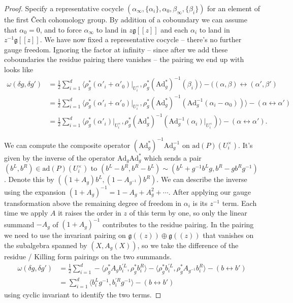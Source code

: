\documentclass[11pt, oneside, reqno]{amsart}
\theoremstyle{definition} \newtheorem{definition}{Definition}[section]
\theoremstyle{definition} \newtheorem{remark}[definition]{Remark}
\theoremstyle{definition} \newtheorem{remarks}[definition]{Remarks}
\theoremstyle{definition} \newtheorem{question}[definition]{Question}
\theoremstyle{definition} \newtheorem*{note}{Note}
\theoremstyle{definition} \newtheorem{example}[definition]{Example}
\theoremstyle{definition} \newtheorem{examples}[definition]{Examples}
\renewcommand{\gg}{\mathfrak{g}}
\newcommand{\mr}[1]{\mathrm{#1}}
\newcommand{\Ad}{\mr{Ad}}
\begin{document}
\begin{proof}
 Specify a representative cocycle $(\alpha_\infty, \{\alpha_i\}, \alpha_0, \beta_\infty, \{\beta_i\})$ for an element of the first \v Cech cohomology group. By addition of a coboundary we can assume that $\alpha_0=0$, and to force $\alpha_\infty$ to land in $z\gg[[z]]$ and each $\alpha_i$ to land in $z^{-1}\gg[[z]]$.  We have now fixed a representative cocycle -- there's no further gauge freedom.  Ignoring the factor at infinity -- since after we add these coboundaries the residue pairing there vanishes -- the pairing we end up with looks like 
\begin{align*}
\omega(\delta g, \delta g') &= \frac 12 \sum_{i=1}^d \langle \rho_g^*(\alpha'_i + \alpha'_0)|_{U^\times_i},\rho_g^* (\Ad_g^*)^{-1}( \beta_i) \rangle - ((\alpha,\beta) \leftrightarrow (\alpha',\beta')\\ 
&= \frac 12 \sum_{i=1}^d \langle \rho_g^*(\alpha'_i + \alpha'_0)|_{U^\times_i}, \rho_g^*(\Ad_g^*)^{-1}(\Ad_g^{-1}(\alpha_i - \alpha_0)) \rangle - (\alpha \leftrightarrow \alpha')\\
&= \frac 12 \sum_{i=1}^d \langle \rho_g^*(\alpha'_i)|_{U^\times_i}, \rho_g^*(\Ad_g^*)^{-1}(\Ad_g^{-1}(\alpha_i)|_{U^\times_i}) \rangle - (\alpha \leftrightarrow \alpha').
\end{align*}

We can compute the composite operator $(\Ad_g^*)^{-1}\Ad_g^{-1}$ on $\mr{ad}(P)(U^\times_i)$.  It's given by the inverse of the operator $\Ad_g\Ad_g^*$ which sends a pair $(b^L, b^R) \in \mr{ad}(P)(U^\times_i)$ to $(b^L - b^R, b^R - b^L) \sim (b^L + g^{-1} b^L g, b^R - g b^R g^{-1})$.  Denote this by $((1+A_g)b^L,(1-A_{g^{-1}})b^R)$.  We can describe the inverse using the expansion $(1+A_g)^{-1} = 1 - A_g + A_g^2 + \cdots$.  After applying our gauge transformation above the remaining degree of freedom in $\alpha_i$ is its $z^{-1}$ term.  Each time we apply $A$ it raises the order in $z$ of this term by one, so only the linear summand $-A_g$ of $(1+A_g)^{-1}$ contributes to the residue pairing.  In the pairing we need to use the invariant pairing on $\gg((z)) \oplus \gg((z))$ that vanishes on the subalgebra spanned by $(X, A_g(X))$, so we take the difference of the residue / Killing form pairings on the two summands.
\begin{align*}
\omega(\delta g, \delta g') &= \frac 12 \sum_{i=1}^d  - \langle \rho_g^*A_g b^{'L}_i, \rho_g^*b^{R}_i \rangle - \langle \rho_g^*b^{'L}_i, \rho_g^*A_{g^{-1}}b^{R}_i \rangle- (b \leftrightarrow b') \\ 
&= \sum_{i=1}^d \langle b^L_ig^{-1}, b^{'R}_i g^{-1} \rangle  - (b \leftrightarrow b')
\end{align*}
using cyclic invariant to identify the two terms. 
\end{proof}
\end{document}
